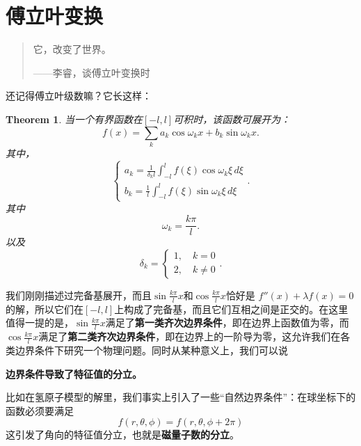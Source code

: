 \documentclass[12pt,a4paper,openany,twoside]{book}
\newtheorem{theorem}{Theorem}[section]
\numberwithin{equation}{section}
\begin{document}
      \section{傅立叶变换}
        \begin{quote}
          它，改变了世界。
          \begin{flushright}
            ——李睿，谈傅立叶变换时
          \end{flushright}
        \end{quote}     
        还记得傅立叶级数嘛？它长这样：
        \begin{theorem}
          当一个有界函数在$[-l,l]$可积时，该函数可展开为：
          \begin{equation}
            f(x) = \sum_k a_k \cos{\omega_k x} + b_k \sin{\omega_k x}.
          \end{equation}
          其中，
          \begin{equation} 
            \begin{cases}
              a_k = \frac{1}{\delta_k l}\int _{-l} ^l f(\xi) \cos{\omega_k} \xi \, d\xi \\
              b_k =  \frac{1}{l} \int _{-l} ^l f(\xi) \sin{\omega_k \xi} \, d\xi 
            \end{cases}
            .
          \end{equation}
          其中
          \begin{equation}
            \omega_k = \frac{k \pi}{l}.
          \end{equation}
          以及
          \begin{equation}
            \delta_k =
            \begin{cases}
              1, \quad k = 0 \\
              2, \quad k \neq 0 
            \end{cases}
            .
          \end{equation}
        \end{theorem}

        我们刚刚描述过完备基展开，而且$\sin{\frac{k \pi}{l} x}$和$\cos{\frac{k \pi}{l} x}$恰好是 $f''(x) + \lambda f(x) = 0$的解，所以它们在$[-l,l]$上构成了完备基，而且它们互相之间是正交的。在这里值得一提的是，$\sin{\frac{k \pi}{l} x}$满足了\textbf{第一类齐次边界条件}，即在边界上函数值为零，而$\cos{\frac{k \pi}{l} x}$满足了\textbf{第二类齐次边界条件}，即在边界上的一阶导为零，这允许我们在各类边界条件下研究一个物理问题。同时从某种意义上，我们可以说
        \begin{center}
          \textbf{边界条件导致了特征值的分立。}
        \end{center}
        比如在氢原子模型的解里，我们事实上引入了一些“自然边界条件”：在球坐标下的函数必须要满足
        \begin{equation}
          f(r,\theta, \phi) = f(r,\theta, \phi + 2\pi)
        \end{equation}
        这引发了角向的特征值分立，也就是\textbf{磁量子数的分立}。
\end{document}
